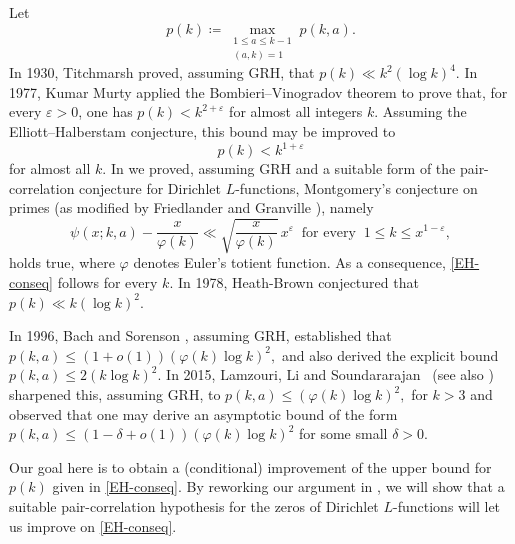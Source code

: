 \documentclass[pdflatex]{sn-jnl}%
\newcommand{\eps}{\ensuremath{\varepsilon}}
\theoremstyle{sltheorems}
\theoremstyle{plainrem}
\theoremstyle{definition}
\begin{document}
Let 
\begin{equation*}
p(k) \coloneq  \max_{\substack{1\le a \le k-1\\ (a,k)=1}} p(k,a).
\end{equation*}
In 1930, Titchmarsh \cite[Theorem 6]{Titchmarsh1930} proved, assuming 
GRH, that
\(
p(k) \ll k^2 (\log k)^4.
\)
In 1977, Kumar Murty \cite{kumarbscthesis} applied the Bombieri--Vinogradov theorem to prove that,
for every $\eps > 0$, one has
\(
p(k) < k^{2 + \eps}
\)
for almost all integers $k$. 
Assuming the Elliott--Halberstam conjecture, this bound may be improved to
\begin{equation}
\label{EH-conseq}
p(k) < k^{1 + \eps}
\end{equation}
for almost all $k$.
In \cite{mathannalen} we proved, assuming GRH and a suitable
form of the pair-correlation conjecture for Dirichlet $L$-functions,
Montgomery's conjecture on primes 
(as modified by Friedlander and Granville \cite[Conjecture 1(b), p.\,366]{FriedlanderG1989}), 
namely
\begin{equation}
\label{mont-conj-primes}
\psi(x;k,a) - \frac{x}{\varphi(k)} \ll \sqrt{\frac{x}{\varphi(k)}}\,x^\eps\ \text{~for~every~}\ 1\le k\le x^{1-\eps},
\end{equation}
holds true, where $\varphi$  denotes Euler's totient function.
As a consequence, \eqref{EH-conseq} follows for every $k$.
In 1978, Heath-Brown \cite{HB78} conjectured that
\(
p(k) \ll k (\log k)^2.
\)


In 1996,
Bach and Sorenson \cite{BachS1996}, assuming GRH, established that
\(
p(k,a) \le (1 + o(1)) (\varphi(k) \log k)^2,
\)
and also derived the explicit bound
$
p(k,a) \le 2 (k \log k)^2.
$
In 2015, Lamzouri, Li and Soundararajan
\,\cite[Corollary 1.2]{LamzouriLS2015} (see also \cite{LamzouriLS2017}) sharpened this, assuming GRH,  to
\(
p(k,a) \le (\varphi(k) \log k)^2,
\)
for $k>3$ and observed that one may derive an asymptotic bound of the form
\(
p(k,a) \le (1 - \delta + o(1)) (\varphi(k) \log k)^2
\)
for some small $\delta > 0$.

Our goal here is to obtain a (conditional) improvement of the upper bound for $p(k)$ given in \eqref{EH-conseq}.
By reworking our argument in \cite{mathannalen}, we will show
 that a suitable pair-correlation 
hypothesis for the zeros of Dirichlet $L$-functions will let us improve on \eqref{EH-conseq}. 
\end{document}

